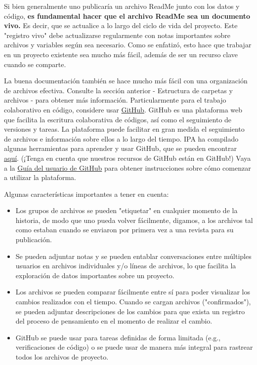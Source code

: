 \documentclass[11pt,en]{elegantpaper}
\begin{document}
Si bien generalmente uno publicaría un archivo ReadMe junto con los datos y código, \textbf{es fundamental hacer que el archivo ReadMe sea un documento vivo.} Es decir, que se actualice a lo largo del ciclo de vida del proyecto. Este "registro vivo" debe actualizarse regularmente con notas importantes sobre archivos y variables según sea necesario. Como se enfatizó, esto hace que trabajar en un proyecto existente sea mucho más fácil, además de ser un recurso clave cuando se comparte.

La buena documentación también se hace mucho más fácil con una organización de archivos efectiva. Consulte la sección anterior - Estructura de carpetas y archivos - para obtener más información. Particularmente para el trabajo colaborativo en código, considere usar \href{https://github.com/}{GitHub}. GitHub es una plataforma web que facilita la escritura colaborativa de códigos, así como el seguimiento de versiones y tareas. La plataforma puede facilitar en gran medida el seguimiento de archivos e información sobre ellos a lo largo del tiempo. IPA ha compilado algunas herramientas para aprender y usar GitHub, que se pueden encontrar \href{https://github.com/PovertyAction/github-training}{aquí}. (¡Tenga en cuenta que nuestros recursos de GitHub están en GitHub!) Vaya a la \href{https://github.com/PovertyAction/github-training/blob/master/resources/GitHub\%20User\%20Guide.md}{Guía del usuario de GitHub} para obtener instrucciones sobre cómo comenzar a utilizar la plataforma.

Algunas características importantes a tener en cuenta:

\begin{itemize}
	\item Los grupos de archivos se pueden "etiquetar" en cualquier momento de la historia, de modo que uno pueda volver fácilmente, digamos, a los archivos tal como estaban cuando se enviaron por primera vez a una revista para su publicación.
	
	\item Se pueden adjuntar notas y se pueden entablar conversaciones entre múltiples usuarios en archivos individuales y/o líneas de archivos, lo que facilita la exploración de datos importantes sobre un proyecto.
	
	\item Los archivos se pueden comparar fácilmente entre sí para poder visualizar los cambios realizados con el tiempo. Cuando se cargan archivos ("confirmados"), se pueden adjuntar descripciones de los cambios para que exista un registro del proceso de pensamiento en el momento de realizar el cambio.
	
	\item GitHub se puede usar para tareas definidas de forma limitada (e.g., verificaciones de código) o se puede usar de manera más integral para rastrear todos los archivos de proyecto.
\end{itemize}
\end{document}
